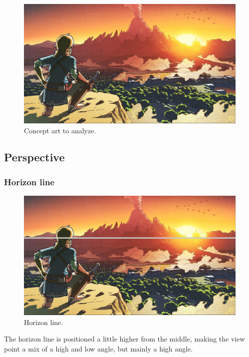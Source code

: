 \documentclass{cup-pan}
\begin{document}
    \begin{figure}[H]
       \includegraphics[width=\textwidth]{Imagenes/Referencias/conceptart_a_analizar_2.png}
        \caption{Concept art to analyze.}
    \end{figure}
    \newpage
        \subsection{Perspective}
            \subsubsection{Horizon line}
                \begin{figure}[H]
                    \includegraphics[width=\textwidth]{Imagenes/Referencias/Analisis_ConceptArt/horizonte.png}
                    \caption{Horizon line.}
                \end{figure}

                The horizon line is positioned a little higher from the middle, making the view point a mix of a high and low angle, but mainly a high angle. \\
\end{document}
